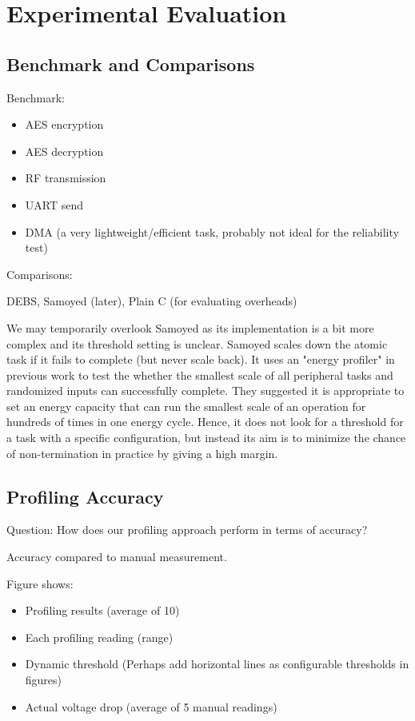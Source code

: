 \newpage
\section{Experimental Evaluation}

\subsection{Benchmark and Comparisons}

Benchmark: 

\begin{itemize}
    \item AES encryption
    \item AES decryption
    \item RF transmission
    \item UART send
    \item DMA (a very lightweight/efficient task, probably not ideal for the reliability test)
\end{itemize}

Comparisons:

DEBS, Samoyed (later), Plain C (for evaluating overheads)

We may temporarily overlook Samoyed as its implementation is a bit more complex and its threshold setting is unclear. 
Samoyed scales down the atomic task if it fails to complete (but never scale back). 
It uses an "energy profiler" in previous work to test the whether the smallest scale of all peripheral tasks and randomized inputs can successfully complete. 
They suggested it is appropriate to set an energy capacity that can run the smallest scale of an operation for hundreds of times in one energy cycle. 
Hence, it does not look for a threshold for a task with a specific configuration, but instead its aim is to minimize the chance of non-termination in practice by giving a high margin.

\subsection{Profiling Accuracy}

Question: How does our profiling approach perform in terms of accuracy?

Accuracy compared to manual measurement.

Figure shows:
\begin{itemize}
    \item Profiling results (average of 10)
    \item Each profiling reading (range)
    \item Dynamic threshold (Perhaps add horizontal lines as configurable thresholds in figures)
    \item Actual voltage drop (average of 5 manual readings)
\end{itemize}

